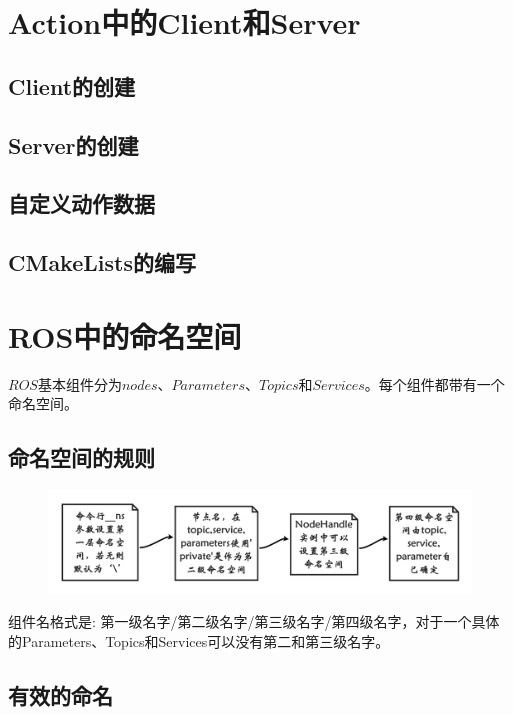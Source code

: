 \documentclass[9pt, oneside]{book}
\begin{document}
\section{Action中的Client和Server}

\subsection{Client的创建}

\subsection{Server的创建}

\subsection{自定义动作数据}

\subsection{CMakeLists的编写}

\section{ROS中的命名空间}

$ROS$基本组件分为$nodes$、$Parameters$、$Topics$和$Services$。每个组件都带有一个命名空间。

\subsection{命名空间的规则}

\begin{figure}[H]
    \centering
    \includegraphics[width = 0.9\linewidth]{image/namespace_rule.png}
\end{figure}

组件名格式是: 第一级名字/第二级名字/第三级名字/第四级名字，对于一个具体的Parameters、Topics和Services可以没有第二和第三级名字。

\subsection{有效的命名}
\end{document}
